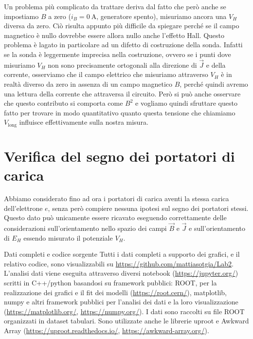 \documentclass[
    prl,
    reprint, 
    superscriptaddress, 
    altaffilletter, 
    amsmath, 
    amssymb, 
    a4paper,
    varvw]{revtex4-2}
\begin{document}
Un problema più complicato da trattare deriva dal fatto che però anche se impostiamo $B$ a zero ($i_B=\SI{0}{\ampere}$, generatore spento), misuriamo ancora una $V_H$ diversa da zero. Ciò risulta appunto più difficile da spiegare perché se il campo magnetico è nullo dovrebbe essere allora nullo anche l'effetto Hall. Questo problema è lagato in particolare ad un difetto di costruzione della sonda. Infatti se la sonda è leggermente imprecisa nella costruzione, ovvero se i punti dove misuriamo $V_H$ non sono precisamente ortogonali alla direzione di $\vec{J}$ e della corrente, osserviamo che il campo elettrico che misuriamo attraverso $V_H$ è in realtà diverso da zero in assenza di un campo magnetico $B$, perché quindi avremo una lettura della corrente che attraversa il circuito. Però si può anche osservare che questo contributo si comporta come $B^2$ e vogliamo quindi sfruttare questo fatto per trovare in modo quantitativo quanto questa tensione che chiamiamo $V_\text{long}$ influisce effettivamente sulla nostra misura. 


\section{Verifica del segno dei portatori di carica}
Abbiamo considerato fino ad ora i portatori di carica aventi la stessa carica dell'elettrone $e$, senza però compiere nessuna ipotesi sul segno dei portatori stessi. Questo dato può unicamente essere ricavato eseguendo correttamente delle considerazioni sull'orientamento nello spazio dei campi $\vec{B}$ e $\vec{J}$ e sull'orientamento di $E_H$ essendo misurato il potenziale $V_H$. 


\begin{methods}{D\lowercase{ati completi e codice sorgente}}
    Tutti i dati completi a supporto dei grafici, e il relativo codice, sono visualizzabili su \url{https://github.com/mattiasotgia/Lab2}. L'analisi dati viene eseguita attraverso diversi notebook (\url{https://jupyter.org/}) scritti in C++/python basandosi su framework pubblici: ROOT, per la realizzazione dei grafici e il fit dei modelli (\url{https://root.cern/}), matplotlib, numpy e altri framework pubblici per l'analisi dei dati e la loro visualizzazione (\url{https://matplotlib.org/}, \url{https://numpy.org/}). I dati sono raccolti su file ROOT organizzati in dataset tabulari. Sono utilizzate anche le librerie uproot e Awkward Array (\url{https://uproot.readthedocs.io/}, \url{https://awkward-array.org/}).
\end{methods}
\end{document}
